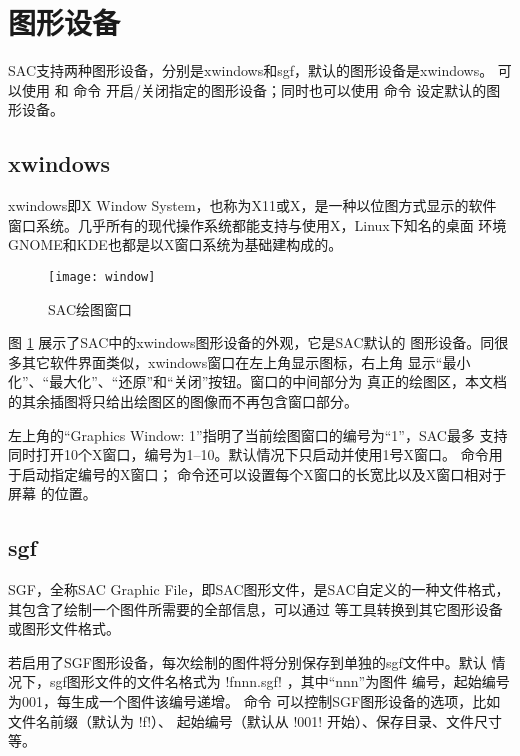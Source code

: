 \section{图形设备}
SAC支持两种图形设备，分别是xwindows和sgf，默认的图形设备是xwindows。
可以使用  和  命令
开启/关闭指定的图形设备；同时也可以使用  命令
设定默认的图形设备。

\subsection{xwindows}
xwindows即X Window System，也称为X11或X，是一种以位图方式显示的软件
窗口系统。几乎所有的现代操作系统都能支持与使用X，Linux下知名的桌面
环境GNOME和KDE也都是以X窗口系统为基础建构成的。

\begin{figure}[H]
\centering
\texttt{[image: window]}
\caption{SAC绘图窗口}
\label{fig:plot}
\end{figure}

图 \ref{fig:plot} 展示了SAC中的xwindows图形设备的外观，它是SAC默认的
图形设备。同很多其它软件界面类似，xwindows窗口在左上角显示图标，右上角
显示``最小化''、``最大化''、``还原''和``关闭''按钮。窗口的中间部分为
真正的绘图区，本文档的其余插图将只给出绘图区的图像而不再包含窗口部分。

左上角的``Graphics Window: 1''指明了当前绘图窗口的编号为``1''，SAC最多
支持同时打开10个X窗口，编号为1--10。默认情况下只启动并使用1号X窗口。
 命令用于启动指定编号的X窗口；
 命令还可以设置每个X窗口的长宽比以及X窗口相对于屏幕
的位置。

\subsection{sgf}
SGF，全称SAC Graphic File，即SAC图形文件，是SAC自定义的一种文件格式，
其包含了绘制一个图件所需要的全部信息，可以通过 
等工具转换到其它图形设备或图形文件格式。

若启用了SGF图形设备，每次绘制的图件将分别保存到单独的sgf文件中。默认
情况下，sgf图形文件的文件名格式为 !fnnn.sgf! ，其中``nnn''为图件
编号，起始编号为001，每生成一个图件该编号递增。 命令
可以控制SGF图形设备的选项，比如文件名前缀（默认为 !f!）、
起始编号（默认从 !001! 开始）、保存目录、文件尺寸等。
